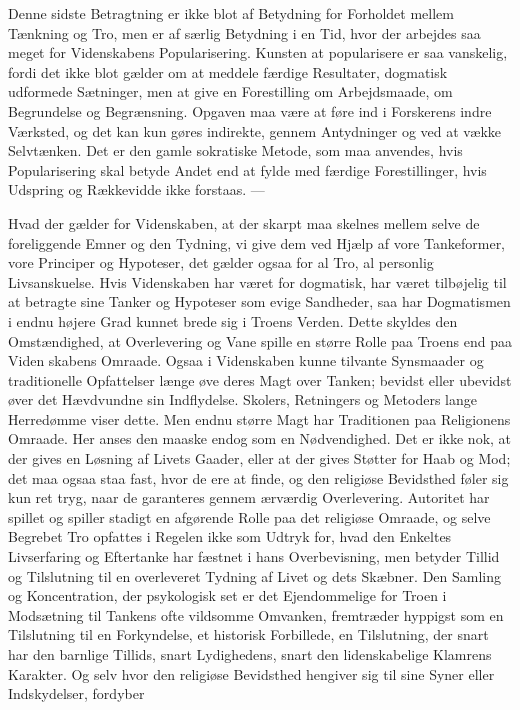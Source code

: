 \documentclass[12pt,a4paper]{article}
\newcommand{\opage}[1]{\marginnote{\footnotesize\textit{[#1]}}}
\begin{document}
Denne sidste Betragtning er ikke blot af Betydning for Forholdet mellem Tænkning
og Tro, men er af særlig Betydning i en Tid, hvor der arbejdes saa meget for
Videnskabens Popularisering. Kunsten at popularisere er saa vanskelig, fordi det
ikke blot gælder om at meddele færdige Resultater, dogmatisk udformede
Sætninger, men at give en Forestilling om Arbejdsmaade, om Begrundelse og
Begrænsning. Opgaven maa være at føre ind i Forskerens indre Værksted, og det
kan kun gøres indirekte, gennem Antydninger og ved at vække Selvtænken. Det er
den gamle sokratiske Metode, som maa anvendes, hvis Popularisering skal betyde
Andet end at fylde med færdige Forestillinger, hvis Udspring og Rækkevidde ikke
forstaas. ---

Hvad der gælder for Videnskaben, at der skarpt maa skelnes mellem selve de
foreliggende Emner og den Tydning, vi give dem ved Hjælp af vore Tankeformer,
vore Principer og Hypoteser, det gælder ogsaa for al Tro, al personlig
Livsanskuelse. Hvis Videnskaben har været for dogmatisk, har været tilbøjelig
til at betragte sine Tanker og Hypoteser som evige Sandheder, saa har
Dogmatismen i endnu højere Grad kunnet brede sig i Troens Verden. Dette skyldes
den Omstændighed, at Overlevering og Vane spille en større Rolle paa Troens end
paa Viden%
\opage{45}skabens Omraade. Ogsaa i Videnskaben kunne tilvante Synsmaader og
traditionelle Opfattelser længe øve deres Magt over Tanken; bevidst eller
ubevidst øver det Hævdvundne sin Indflydelse. Skolers, Retningers og Metoders
lange Herredømme viser dette. Men endnu større Magt har Traditionen paa
Religionens Omraade. Her anses den maaske endog som en Nødvendighed. Det er ikke
nok, at der gives en Løsning af Livets Gaader, eller at der gives Støtter for
Haab og Mod; det maa ogsaa staa fast, hvor de ere at finde, og den religiøse
Bevidsthed føler sig kun ret tryg, naar de garanteres gennem ærværdig
Overlevering. Autoritet har spillet og spiller stadigt en afgørende Rolle paa
det religiøse Omraade, og selve Begrebet Tro opfattes i Regelen ikke som Udtryk
for, hvad den Enkeltes Livserfaring og Eftertanke har fæstnet i hans
Overbevisning, men betyder Tillid og Tilslutning til en overleveret Tydning af
Livet og dets Skæbner. Den Samling og Koncentration, der psykologisk set er det
Ejendommelige for Troen i Modsætning til Tankens ofte vildsomme Omvanken,
fremtræder hyppigst som en Tilslutning til en Forkyndelse, et historisk
Forbillede, en Tilslutning, der snart har den barnlige Tillids, snart
Lydighedens, snart den lidenskabelige Klamrens Karakter. Og selv hvor den
religiøse Bevidsthed hengiver sig til sine Syner eller Indskydelser, fordyber
\end{document}
